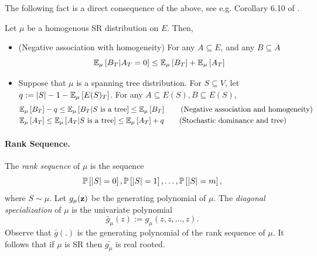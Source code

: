 The following fact is a direct consequence of the above, see e.g. Corollary 6.10 of \cite{OSS11}.
\begin{fact}
\label{fact:e1}
Let $\mu$ be a homogenous SR distribution on $E$. Then,
\begin{itemize}
\item (Negative association with homogeneity) For any $A\subseteq E$, and  any $B\subseteq \overline{A}$ 
\begin{equation} \EE{\mu}{ B_T | A_T = 0} \leq \EE{\mu}{B_T} + \EE{\mu}{A_T} 
\label{fact:e0}
\end{equation}	
\item Suppose that $\mu$ is a spanning tree distribution. For  $S\subseteq V$, let $q:=|S|-1-\EE{\mu}{E(S)_T}$.  For any $A\subseteq E(S), B\subseteq \overline{E(S)}$,
\begin{align}
&\EE{\mu}{B_T}  - q \le \EE{\mu}{ B_T | S\text{ is a tree}} \le \EE{\mu}{B_T}\tag{Negative association and homogeneity}\\
 &\EE{\mu}{A_T}
 \leq \EE{\mu}{A_T | S\text{ is a tree}} \leq \EE{\mu}{A_T}+q
\tag{Stochastic dominance and tree}
\end{align}
\end{itemize}
\end{fact}
%



\paragraph{Rank Sequence.}

The {\em rank sequence} of $\mu$ is the sequence
$$\P{|S|=0}, \P{|S|=1}, \ldots,\P{|S|=m},$$
where $S\sim\mu$.
Let $g_\mu({\bf z})$ be the generating polynomial of $\mu$.
The {\em diagonal specialization} of $\mu$ is the univariate polynomial 
$$\bar{g}_\mu(z):=g_\mu(z,z,\dots,z). $$ Observe that $\bar{g}(.)$ is the generating polynomial of the rank sequence of $\mu$. It follows that if $\mu$ is SR then $\bar{g_\mu}$ is real rooted.



